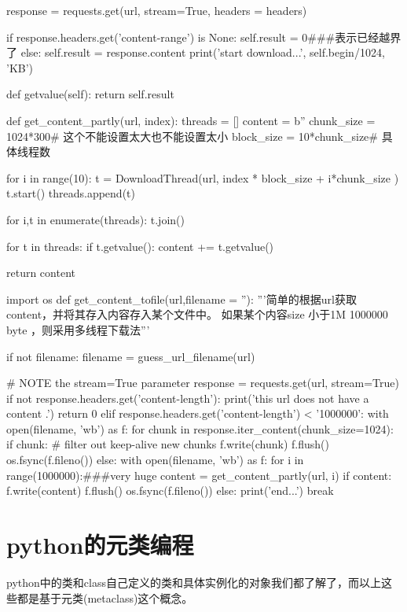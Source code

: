 \documentclass[12pt,oneside]{book}
\begin{document}
\begin{common-format}
\begin{tcbpython}[]
        response = requests.get(url, stream=True, headers = headers)

        if response.headers.get('content-range') is None:
            self.result = 0###表示已经越界了
        else:
            self.result = response.content
            print('start download...', self.begin/1024, 'KB')

    def getvalue(self):
        return self.result

def get_content_partly(url, index):
    threads = []
    content = b''
    chunk_size = 1024*300# 这个不能设置太大也不能设置太小
    block_size = 10*chunk_size# 具体线程数

    for i in range(10):
        t = DownloadThread(url, index * block_size + i*chunk_size )
        t.start()
        threads.append(t)

    for i,t in enumerate(threads):
        t.join()

    for t in threads:
        if  t.getvalue():
            content += t.getvalue()

    return content

import os
def get_content_tofile(url,filename = ''):
    '''简单的根据url获取content，并将其存入内容存入某个文件中。
    如果某个内容size 小于1M 1000000 byte ，则采用多线程下载法'''

    if not filename:
        filename = guess_url_filename(url)

    # NOTE the stream=True parameter
    response = requests.get(url, stream=True)
    if not response.headers.get('content-length'):
        print('this url does not have a content .')
        return 0
    elif response.headers.get('content-length') < '1000000':
        with open(filename, 'wb') as f:
            for chunk in response.iter_content(chunk_size=1024):
                if chunk: # filter out keep-alive new chunks
                    f.write(chunk)
                    f.flush()
                    os.fsync(f.fileno())
    else:
        with open(filename, 'wb') as f:
            for i in range(1000000):###very huge
                content = get_content_partly(url, i)
                if content:
                    f.write(content)
                    f.flush()
                    os.fsync(f.fileno())
                else:
                    print('end...')
                    break
\end{tcbpython}%

\chapter{python的元类编程}
python中的类和class自己定义的类和具体实例化的对象我们都了解了，而以上这些都是基于元类(metaclass)这个概念。


\end{common-format}
\end{document}
